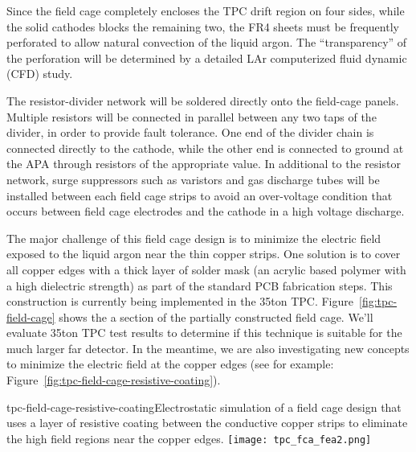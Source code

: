 Since the field cage completely encloses the TPC drift region on four sides, while the solid cathodes blocks the remaining two, the FR4 sheets must 
be frequently perforated to allow natural convection of the liquid argon.  
The ``transparency'' of the perforation will be determined by a 
detailed LAr computerized fluid dynamic (CFD) study.


The resistor-divider network will be soldered directly onto the field-cage panels. 
Multiple resistors will be connected in parallel between any two taps of the divider,
in order to provide fault tolerance. 
One end of the divider chain is connected directly to the cathode, while the other end is connected to ground at the APA through resistors of the appropriate value. 
In additional to the resistor network, surge suppressors such as varistors and gas discharge tubes will be installed between each field cage strips to avoid an over-voltage condition that occurs between field cage electrodes and the cathode in a high voltage discharge.


The major challenge of this field cage design is to minimize the electric field exposed to the liquid argon near the thin copper strips.  One solution is to cover all copper edges with a thick layer of solder mask (an acrylic based polymer with a high dielectric strength) as part of the standard PCB fabrication steps.  This construction is currently being implemented in the 35ton TPC.  Figure~\ref{fig:tpc-field-cage} shows 
the a section of the partially constructed field cage.  We'll evaluate 35ton TPC test results to determine if this technique is suitable for the much larger far detector.  In the meantime, we are also investigating new concepts to minimize the electric field at the copper edges (see for example: Figure~\ref{fig:tpc-field-cage-resistive-coating}).

\begin{cdrfigure}{tpc-field-cage-resistive-coating}{Electrostatic simulation of a field cage design that uses a layer of resistive coating between the conductive copper strips to eliminate the high field regions near the copper edges.}
\texttt{[image: tpc\_fca\_fea2.png]}
\end{cdrfigure}



   

